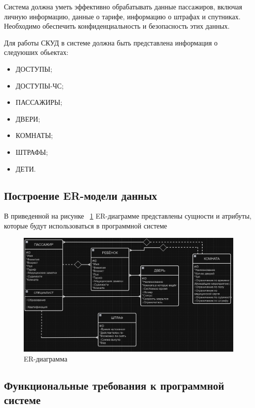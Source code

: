 Система должна уметь эффективно обрабатывать данные пассажиров, включая личную информацию, данные о тарифе, информацию о штрафах и спутниках. Необходимо обеспечить конфиденциальность и безопасность этих данных.

Для работы СКУД в системе должна быть представлена информация о следуюших обьектах:

\begin{itemize}
	\item ДОСТУПЫ;
	\item ДОСТУПЫ-ЧС;
	\item ПАССАЖИРЫ;
	\item ДВЕРИ;
	\item КОМНАТЫ;
	\item ШТРАФЫ;
	\item ДЕТИ.
\end{itemize}


\subsection{Построение ER-модели данных}

В приведенной на рисунке ~\ref{fig:er} ER-диаграмме представлены сущности и атрибуты, которые будут использоваться в программной системе 

\begin{figure}[ht]
	\centering
	\includegraphics[width=1\linewidth]{images/ER}
	\caption{ER-диаграмма}
	\label{fig:er}
\end{figure}

\subsection{Функциональные требования к программной системе}

